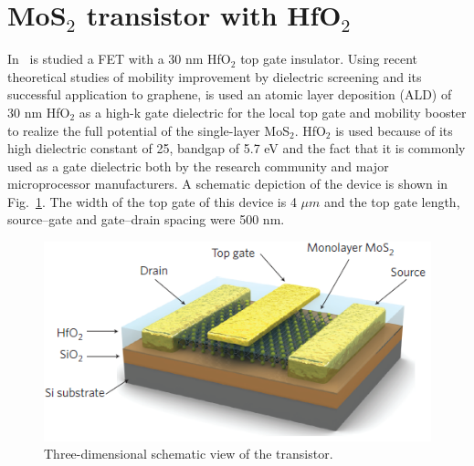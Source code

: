 \documentclass[12pt,a4paper,titlepage]{article}
\begin{document}
\section{MoS$_2$ transistor with HfO$_2$}
In~\cite{Radisavljevic:Si_MoS2} is studied a FET with a 30 nm HfO$_2$ top gate insulator. Using recent theoretical studies of mobility improvement by dielectric screening and its successful application to graphene, is used an atomic layer deposition (ALD) of 30 nm HfO$_2$ as a high-k gate dielectric for the
local top gate and mobility booster to realize the full potential of the single-layer MoS$_2$. HfO$_2$ is used because of its high dielectric constant of 25, bandgap of 5.7 eV and the fact that it is commonly used as a gate dielectric both by the research community and major microprocessor manufacturers. A schematic depiction of the device is shown in Fig.~\ref{fig:HfO2_fabrication}. The width of the top gate of this device is 4 $\mu m$ and the top gate length, source–gate and gate–drain spacing were 500 nm.

\begin{figure}[H]
	\centering
	\includegraphics[width=1\textwidth]{Immagini/HfO2_fabrication.png} 
	\caption{Three-dimensional schematic view of the transistor.~\cite{Radisavljevic:Si_MoS2}}
	\label{fig:HfO2_fabrication}
\end{figure} 
\end{document}
